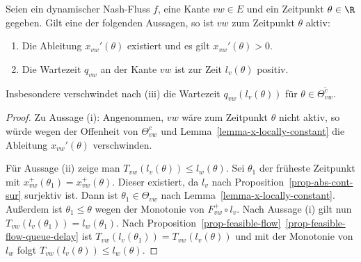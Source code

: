 \begin{lemma}\label{lemma-nash-flow-waiting-queue-implies-active-edge}
	Seien ein dynamischer Nash-Fluss $f$, eine Kante $vw\in E$ und ein Zeitpunkt $\theta\in\R$ gegeben.
	Gilt eine der folgenden Aussagen, so ist $vw$ zum Zeitpunkt $\theta$ aktiv:
	\begin{enumerate}[label=(\roman*)]
		\item Die Ableitung $x_{vw}'(\theta)$ existiert und es gilt $x_{vw}'(\theta)> 0$.
		\item Die Wartezeit $q_{vw}$ an der Kante $vw$ ist zur Zeit $l_v(\theta)$ positiv.
	\end{enumerate}
	Insbesondere verschwindet nach (iii) die Wartezeit $q_{vw}(l_v(\theta))$ für $\theta\in\overline{\Theta_{vw}^c}$.
\end{lemma}
\begin{proof}
	Zu Aussage (i): Angenommen, $vw$ wäre zum Zeitpunkt $\theta$ nicht aktiv, so würde wegen der Offenheit von $\Theta_{vw}^c$ und Lemma~\ref{lemma-x-locally-constant} die Ableitung $x_{vw}'(\theta)$ verschwinden.
	
	Für Aussage (ii) zeige man $T_{vw}(l_v(\theta)) \leq l_w(\theta)$.
	Sei $\theta_1$ der früheste Zeitpunkt mit $x_{vw}^+(\theta_1)= x_{vw}^+(\theta)$.
	Dieser existiert, da $l_v$ nach Proposition~\ref{prop-abs-cont-sur} surjektiv ist.
	Dann ist $\theta_1\in \Theta_{vw}$ nach Lemma~\ref{lemma-x-locally-constant}.
	Außerdem ist $\theta_1 \leq \theta$ wegen der Monotonie von $F_{vw}^+ \circ l_v$.
	Nach Aussage (i) gilt nun $T_{vw}(l_v(\theta_1)) = l_w(\theta_1)$.
	Nach Proposition~\ref{prop-feasible-flow}~\ref{prop-feasible-flow-queue-delay} ist $T_{vw}(l_v(\theta_1)) = T_{vw}(l_v(\theta))$ und mit der Monotonie von $l_w$ folgt $T_{vw}(l_v(\theta))\leq l_w(\theta)$.
\end{proof}

